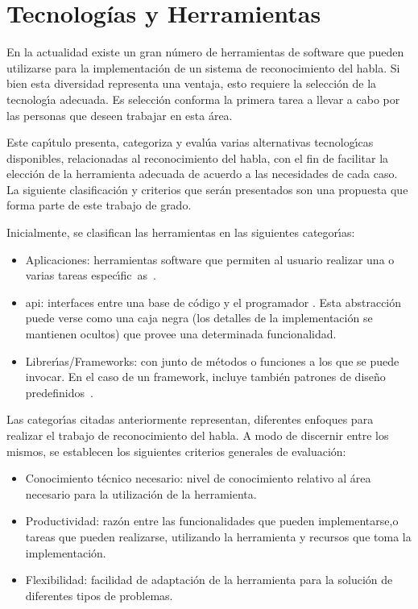  \chapter{Tecnolog\'ias y Herramientas}
\label{sec:tecnologias}

En la actualidad existe un gran n\'umero de herramientas de software que pueden utilizarse para la implementaci\'on de un
sistema de reconocimiento del habla. Si bien esta diversidad representa una ventaja, esto requiere
la selecci\'on de la tecnolog{\'\i}a adecuada. Es selecci\'on conforma la primera tarea a llevar a
cabo por las personas que deseen trabajar en esta \'area.

Este cap{\'\i}tulo presenta, categoriza y eval\'ua varias alternativas tecnolog{\'\i}cas disponibles, relacionadas
al reconocimiento del habla, con el fin de facilitar la elecci\'on de la herramienta adecuada
de acuerdo a las necesidades de cada caso. La siguiente clasificaci\'on y criterios que ser\'an presentados son
una propuesta que forma parte de este trabajo de grado.

Inicialmente, se clasifican las herramientas en las siguientes categor{\'\i}as:
\begin{itemize}
	\item Aplicaciones: herramientas software que permiten al usuario realizar una o
	varias tareas \mbox{espec{\'\i}fic as \cite{GoodwillComputer}}.
    \item \gls{api}: interfaces entre una base de c\'odigo y
	el programador \cite{DoucetteOnApi}. Esta abstracci\'on puede verse como una caja negra
	(los detalles de la implementaci\'on se mantienen ocultos) que provee una determinada funcionalidad.
	\item Librer{\'\i}as/Frameworks: con junto de m\'etodos o funciones a los que se puede invocar.
	En el caso de un framework, incluye tambi\'en patrones de dise\~no
	\mbox{predefinidos \cite{FowlerInversion}}.
\end{itemize}

Las categor{\'\i}as citadas anteriormente representan, diferentes enfoques para realizar el trabajo
de reconocimiento del habla. A modo de discernir entre los mismos, se establecen
los siguientes criterios generales de evaluaci\'on:
\begin{itemize}
	\item Conocimiento t\'ecnico necesario: nivel de conocimiento relativo al \'area necesario para la
	utilizaci\'on de la herramienta. 
	\item Productividad: raz\'on entre las funcionalidades que pueden implementarse,o tareas que pueden
	realizarse, utilizando la herramienta y recursos que toma la implementaci\'on.
	\item Flexibilidad: facilidad de adaptaci\'on de la herramienta para la soluci\'on de diferentes
	tipos de problemas.
\end{itemize}

